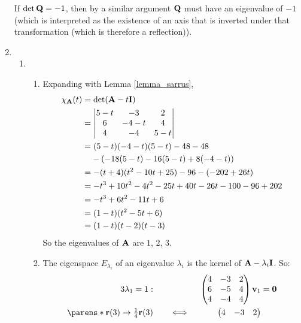 \documentclass[fleqn,a4paper,11pt]{article}
\begin{document}
\begin{enumerate}[label=\textbf{\arabic*.}]
   If \(\det \mathbf{Q} = -1\), then by a similar argument \(\mathbf{Q}\) must have an
   eigenvalue of \(-1\) (which is interpreted as the existence of an axis that
   is inverted under that transformation (which is therefore a reflection)).
  \item
   \begin{enumerate}[label=(\textbf{\Alph*})]
    \item
     \begin{enumerate}[label=(\roman*)]
      \item Expanding with Lemma \ref{lemma_sarrus},
       \begin{align*}
        \chi_{\mat A}(t)
         &= \det(\mat A - t \mat I) \\
         &= \begin{vmatrix}
          5 - t & -3 & 2 \\
          6 & -4 - t & 4 \\
          4 & -4 & 5 - t
         \end{vmatrix} \\
        &= (5 - t)(-4 - t)(5 - t) - 48 - 48 \\
        &\phantom{={}} - (-18(5 - t) - 16(5 - t) + 8(-4 - t)) \\
        &= -(t + 4)(t^2 - 10t + 25) - 96 - (-202 + 26t) \\
        &= -t^3 + 10t^2 - 4t^2 - 25t + 40t - 26t - 100 - 96 + 202 \\
        &= -t^3 + 6t^2 - 11t + 6 \\
        &= (1 - t)(t^2 - 5t + 6) \\
        &= (1 - t)(t - 2)(t - 3)
       \end{align*}
       So the eigenvalues of \(\mathbf{A}\) are \(1\), \(2\), \(3\).
      \item
       The eigenspace \(E_{\lambda_i}\) of an eigenvalue
       \(\lambda_i\) is the kernel of \(\mathbf{A} - \lambda_i \mathbf{I}\). So:
       \begin{alignat*}3
        \lambda_1 = 1:\quad&&
        &&\begin{pmatrix}
         4 & -3 & 2 \\
         6 & -5 & 4 \\
         4 & -4 & 4
        \end{pmatrix}
        \vec v_1 &= \vec 0 \\
        \parens*{\vec r(3) \to \tfrac 14 \vec r(3)}\quad
        && \iff{}&&\begin{pmatrix}
         4 & -3 & 2 \\

\end{pmatrix}
\end{alignat*}
\end{enumerate}
\end{enumerate}
\end{enumerate}
\end{document}
